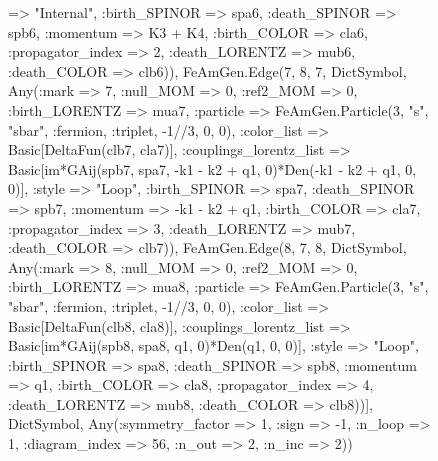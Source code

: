 \documentclass{revtex4}
\begin{document}
\begin{figure}[!htb]
\begin{center}
{=> "Internal", :birth_SPINOR => spa6, :death_SPINOR => spb6, :momentum => K3 + K4, :birth_COLOR => cla6, :propagator_index => 2, :death_LORENTZ => mub6, :death_COLOR => clb6)), FeAmGen.Edge(7, 8, 7, Dict{Symbol, Any}(:mark => 7, :null_MOM => 0, :ref2_MOM => 0, :birth_LORENTZ => mua7, :particle => FeAmGen.Particle(3, "s", "sbar", :fermion, :triplet, -1//3, 0, 0), :color_list => Basic[DeltaFun(clb7, cla7)], :couplings_lorentz_list => Basic[im*GAij(spb7, spa7, -k1 - k2 + q1, 0)*Den(-k1 - k2 + q1, 0, 0)], :style => "Loop", :birth_SPINOR => spa7, :death_SPINOR => spb7, :momentum => -k1 - k2 + q1, :birth_COLOR => cla7, :propagator_index => 3, :death_LORENTZ => mub7, :death_COLOR => clb7)), FeAmGen.Edge(8, 7, 8, Dict{Symbol, Any}(:mark => 8, :null_MOM => 0, :ref2_MOM => 0, :birth_LORENTZ => mua8, :particle => FeAmGen.Particle(3, "s", "sbar", :fermion, :triplet, -1//3, 0, 0), :color_list => Basic[DeltaFun(clb8, cla8)], :couplings_lorentz_list => Basic[im*GAij(spb8, spa8, q1, 0)*Den(q1, 0, 0)], :style => "Loop", :birth_SPINOR => spa8, :death_SPINOR => spb8, :momentum => q1, :birth_COLOR => cla8, :propagator_index => 4, :death_LORENTZ => mub8, :death_COLOR => clb8))], Dict{Symbol, Any}(:symmetry_factor => 1, :sign => -1, :n_loop => 1, :diagram_index => 56, :n_out => 2, :n_inc => 2)) 
}
\end{center}
\end{figure}
\end{document}
